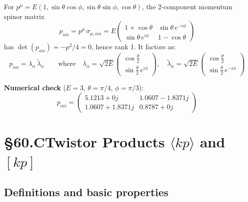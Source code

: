 For $p^\mu = E(1,\sin\theta\cos\phi,\sin\theta\sin\phi,\cos\theta)$, the
2-component momentum spinor matrix
\begin{equation}
  p_{\alpha\dot\alpha} = p^\mu\,\sigma_{\mu,\alpha\dot\alpha}
  = E\begin{pmatrix}1+\cos\theta & \sin\theta\,e^{-i\phi} \\
                   \sin\theta\,e^{i\phi} & 1-\cos\theta\end{pmatrix}
  \tag{60.4}
\end{equation}
has $\det(p_{\alpha\dot\alpha}) = -p^2/4 = 0$, hence rank 1.  It factors as:
\begin{equation}
  \boxed{
    p_{\alpha\dot\alpha} = \lambda_\alpha\,\tilde\lambda_{\dot\alpha}
  }
  \qquad \text{where}\quad
  \lambda_\alpha = \sqrt{2E}\!\begin{pmatrix}\cos\tfrac\theta2\\\sin\tfrac\theta2\,e^{i\phi}\end{pmatrix},
  \quad
  \tilde\lambda_{\dot\alpha} = \sqrt{2E}\!\begin{pmatrix}\cos\tfrac\theta2\\\sin\tfrac\theta2\,e^{-i\phi}\end{pmatrix}
  \tag{60.5}
\end{equation}

\textbf{Numerical check} ($E=3$, $\theta=\pi/4$, $\phi=\pi/3$):
\[
  p_{\alpha\dot\alpha} = \begin{pmatrix}5.1213+0j & 1.0607-1.8371j \\ 1.0607+1.8371j & 0.8787+0j\end{pmatrix}
\]


\section{§60.C\quad Twistor Products $\langle kp\rangle$ and $[kp]$}

\subsection{Definitions and basic properties}


